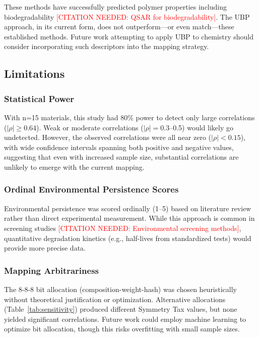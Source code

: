 \documentclass[11pt,letterpaper]{article}
\begin{document}
These methods have successfully predicted polymer properties including biodegradability \textcolor{red}{[CITATION NEEDED: QSAR for biodegradability]}. The UBP approach, in its current form, does not outperform—or even match—these established methods. Future work attempting to apply UBP to chemistry should consider incorporating such descriptors into the mapping strategy.

\subsection{Limitations}

\subsubsection{Statistical Power}
With n=15 materials, this study had 80\% power to detect only large correlations ($|\rho| \geq 0.64$). Weak or moderate correlations ($|\rho| = 0.3$--0.5) would likely go undetected. However, the observed correlations were all near zero ($|\rho| < 0.15$), with wide confidence intervals spanning both positive and negative values, suggesting that even with increased sample size, substantial correlations are unlikely to emerge with the current mapping.

\subsubsection{Ordinal Environmental Persistence Scores}
Environmental persistence was scored ordinally (1--5) based on literature review rather than direct experimental measurement. While this approach is common in screening studies \textcolor{red}{[CITATION NEEDED: Environmental screening methods]}, quantitative degradation kinetics (e.g., half-lives from standardized tests) would provide more precise data.

\subsubsection{Mapping Arbitrariness}
The 8-8-8 bit allocation (composition-weight-hash) was chosen heuristically without theoretical justification or optimization. Alternative allocations (Table~\ref{tab:sensitivity}) produced different Symmetry Tax values, but none yielded significant correlations. Future work could employ machine learning to optimize bit allocation, though this risks overfitting with small sample sizes.
\end{document}
